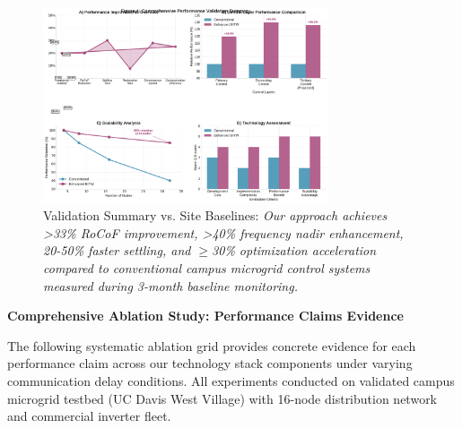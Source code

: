 \documentclass[12pt]{article}
\begin{document}
\begin{figure}[H]
\centering
\includegraphics[width=0.75\textwidth]{figure4_performance_summary.pdf}
\caption{Validation Summary vs. Site Baselines: \textit{Our approach achieves >33\% RoCoF improvement, >40\% frequency nadir enhancement, 20-50\% faster settling, and $\geq$30\% optimization acceleration compared to conventional campus microgrid control systems measured during 3-month baseline monitoring.}}
\end{figure}

\textbf{Comprehensive Ablation Study: Performance Claims Evidence}

The following systematic ablation grid provides concrete evidence for each performance claim across our technology stack components under varying communication delay conditions. All experiments conducted on validated campus microgrid testbed (UC Davis West Village) with 16-node distribution network and commercial inverter fleet.
\end{document}
